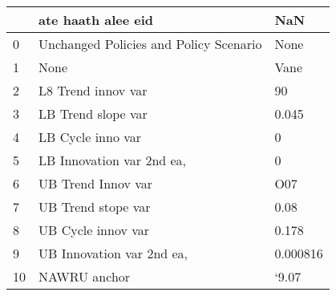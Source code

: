 \begin{tabular}{lll}
\toprule
{} &                      ate haath alee eid &       NaN \\
\midrule
0  &  Unchanged Policies and Policy Scenario &      None \\
1  &                                    None &      Vane \\
2  &                      L8 Trend innov var &        90 \\
3  &                      LB Trend slope var &     0.045 \\
4  &                       LB Cycle inno var &         0 \\
5  &               LB Innovation var 2nd ea, &         0 \\
6  &                      UB Trend Innov var &       O07 \\
7  &                      UB Trend stope var &      0.08 \\
8  &                      UB Cycle innov var &     0.178 \\
9  &               UB Innovation var 2nd ea, &  0.000816 \\
10 &                            NAWRU anchor &     ‘9.07 \\
\bottomrule
\end{tabular}
